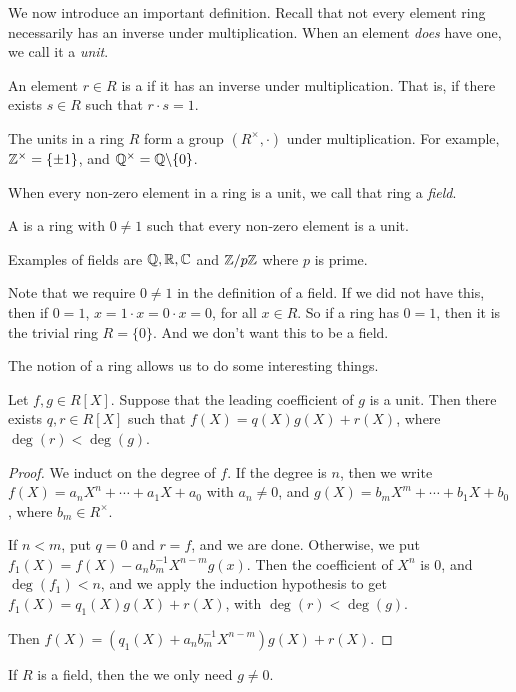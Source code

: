 \documentclass[a4paper]{scrreprt}
\begin{document}

We now introduce an important definition. Recall that not every element ring necessarily has an inverse under multiplication. When an element \emph{does} have one, we call it a \emph{unit}.

\begin{definition}[Unit]
	An element $r \in R$ is a  if it has an inverse under multiplication. That is, if there exists $s \in R$ such that $r\cdot s = 1$.
\end{definition}

The units in a ring $R$ form a group $(R^\times, \cdot)$ under multiplication. For example, $\mathbb{Z}^\times = \{\pm 1\}$, and $\mathbb{Q}^\times = \mathbb{Q} \backslash \{0\}$.

When every non-zero element in a ring is a unit, we call that ring a \emph{field}.

\begin{definition}[Field]
	A  is a ring with $0 \neq 1$ such that every non-zero element is a unit.
\end{definition}

Examples of fields are $\mathbb{Q}, \mathbb{R}, \mathbb{C}$ and $\mathbb{Z}/p\mathbb{Z}$ where $p$ is prime.

\begin{remark}
	Note that we require $0 \neq 1$ in the definition of a field. If we did not have this, then if $0 = 1$, $x = 1 \cdot x = 0 \cdot x = 0$, for all $x \in R$. So if a ring has $0 = 1$, then it is the trivial ring $R = \{0\}$. And we don't want this to be a field.
\end{remark}

The notion of a ring allows us to do some interesting things.

\begin{lemma}
	Let $f, g \in R[X]$. Suppose that the leading coefficient of $g$ is a unit. Then there exists $q, r \in R[X]$ such that $f(X) = q(X) g(X) + r(X)$, where $\deg(r) < \deg(g)$.
\end{lemma}
\begin{proof}
	We induct on the degree of $f$. If the degree is $n$, then we write $f(X) = a_n X^n + \cdots + a_1 X + a_0$ with $a_n \neq 0$, and $g(X) = b_m X^m + \cdots + b_1  X + b_0$, where $b_m \in R^\times$.

	If $n < m$, put $q = 0$ and $r = f$, and we are done. Otherwise, we put $f_1(X) = f(X) - a_n b_m^{-1}X^{n - m}g(x)$. Then the coefficient of $X^n$ is $0$, and $\deg(f_1) < n$, and we apply the induction hypothesis to get $f_1(X) = q_1(X)g(X) + r(X)$, with $\deg(r) < \deg(g)$.

	Then $f(X) =(q_1(X) + a_n b_{m}^{-1} X^{n - m})g(X) + r(X)$.
\end{proof}

\begin{remark}
	If $R$ is a field, then the we only need $g \neq 0$.
\end{remark}
\end{document}
